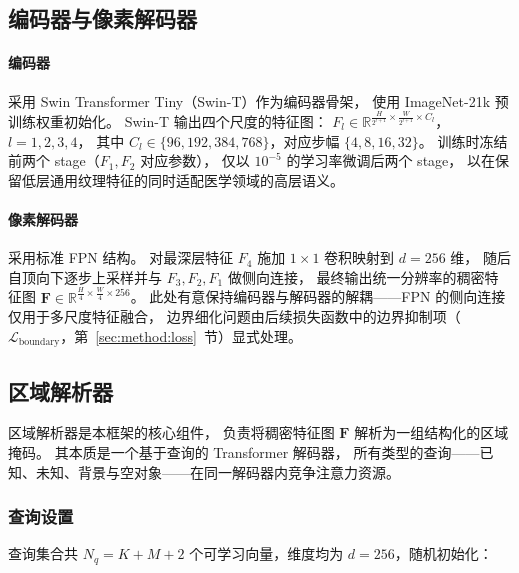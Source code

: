 \documentclass[3p,twocolumn,authoryear]{elsarticle}
\newcommand{\R}{\mathbb{R}}                              %
\newcommand{\bF}{\mathbf{F}}                              %
\begin{document}
\subsection{编码器与像素解码器}\label{sec:method:encoder}

\paragraph{编码器}
采用 Swin Transformer Tiny（Swin-T）作为编码器骨架，
使用 ImageNet-21k 预训练权重初始化。
Swin-T 输出四个尺度的特征图：
$F_l \in \R^{\frac{H}{2^{l+1}} \times \frac{W}{2^{l+1}} \times C_l}$，$l=1,2,3,4$，
其中 $C_l \in \{96, 192, 384, 768\}$，对应步幅 $\{4, 8, 16, 32\}$。
训练时冻结前两个 stage（$F_1, F_2$ 对应参数），
仅以 $10^{-5}$ 的学习率微调后两个 stage，
以在保留低层通用纹理特征的同时适配医学领域的高层语义。

\paragraph{像素解码器}
采用标准 FPN 结构。
对最深层特征 $F_4$ 施加 $1 \times 1$ 卷积映射到 $d=256$ 维，
随后自顶向下逐步上采样并与 $F_3, F_2, F_1$ 做侧向连接，
最终输出统一分辨率的稠密特征图 $\bF \in \R^{\frac{H}{4} \times \frac{W}{4} \times 256}$。
此处有意保持编码器与解码器的解耦——FPN 的侧向连接仅用于多尺度特征融合，
边界细化问题由后续损失函数中的边界抑制项（$\mathcal{L}_{\text{boundary}}$，第~\ref{sec:method:loss}~节）显式处理。

\subsection{区域解析器}\label{sec:method:parser}

区域解析器是本框架的核心组件，
负责将稠密特征图 $\bF$ 解析为一组结构化的区域掩码。
其本质是一个基于查询的 Transformer 解码器，
所有类型的查询——已知、未知、背景与空对象——在同一解码器内竞争注意力资源。

\subsubsection{查询设置}\label{sec:method:parser:query}

查询集合共 $N_q = K + M + 2$ 个可学习向量，维度均为 $d=256$，随机初始化：
\end{document}
